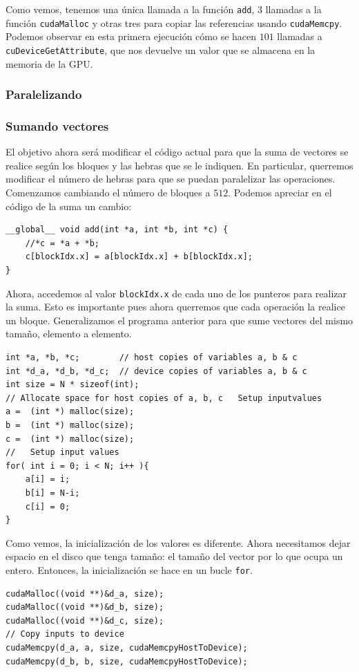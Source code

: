 \documentclass[11pt]{article}
\def\inline{\lstinline[basicstyle=\ttfamily,keywordstyle={}]}
\theoremstyle{plain}
\begin{document}
Como vemos, tenemos una única llamada a la función \inline{add}, $3$ llamadas a la función \inline{cudaMalloc} y otras tres para copiar las referencias usando \inline{cudaMemcpy}. Podemos observar en esta primera ejecución cómo se hacen $101$ llamadas a \inline{cuDeviceGetAttribute}, que nos devuelve un valor que se almacena en la memoria de la GPU.

\subsubsection{Paralelizando}
\subsubsection*{Sumando vectores}

El objetivo ahora será modificar el código actual para que la suma de vectores se realice según los bloques y las hebras que se le indiquen. En particular, querremos modificar el número de hebras para que se puedan paralelizar las operaciones. Comenzamos cambiando el número de bloques a $512$. Podemos apreciar en el código de la suma un cambio:
\begin{verbatim}
__global__ void add(int *a, int *b, int *c) {
    //*c = *a + *b;
    c[blockIdx.x] = a[blockIdx.x] + b[blockIdx.x];
}
\end{verbatim}

Ahora, accedemos al valor \inline{blockIdx.x} de cada uno de los punteros para realizar la suma. Esto es importante pues ahora querremos que cada operación la realice un bloque. Generalizamos el programa anterior para que sume vectores del mismo tamaño, elemento a elemento.

\begin{verbatim}
int *a, *b, *c;        // host copies of variables a, b & c
int *d_a, *d_b, *d_c;  // device copies of variables a, b & c
int size = N * sizeof(int);
// Allocate space for host copies of a, b, c   Setup inputvalues  
a =  (int *) malloc(size); 
b =  (int *) malloc(size); 
c =  (int *) malloc(size); 
//   Setup input values  
for( int i = 0; i < N; i++ ){
	a[i] = i;
  	b[i] = N-i;
	c[i] = 0;
}	
\end{verbatim}

Como vemos, la inicialización de los valores es diferente. Ahora necesitamos dejar espacio en el disco que tenga tamaño: el tamaño del vector por lo que ocupa un entero. Entonces, la inicialización se hace en un bucle \inline{for}.

\begin{verbatim}
cudaMalloc((void **)&d_a, size);
cudaMalloc((void **)&d_b, size);
cudaMalloc((void **)&d_c, size);
// Copy inputs to device
cudaMemcpy(d_a, a, size, cudaMemcpyHostToDevice);
cudaMemcpy(d_b, b, size, cudaMemcpyHostToDevice);
\end{verbatim}
\end{document}

